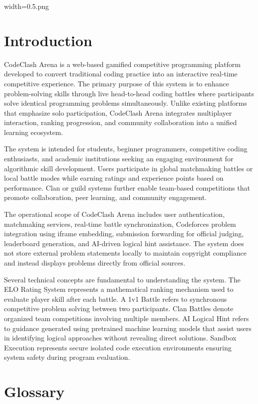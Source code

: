 width=0.5\linewidthimage.png\documentclass[12pt,a4paper]{article}
\begin{document}
\section{Introduction}

CodeClash Arena is a web-based gamified competitive programming platform developed to convert traditional coding practice into an interactive real-time competitive experience. The primary purpose of this system is to enhance problem-solving skills through live head-to-head coding battles where participants solve identical programming problems simultaneously. Unlike existing platforms that emphasize solo participation, CodeClash Arena integrates multiplayer interaction, ranking progression, and community collaboration into a unified learning ecosystem.

The system is intended for students, beginner programmers, competitive coding enthusiasts, and academic institutions seeking an engaging environment for algorithmic skill development. Users participate in global matchmaking battles or local battle modes while earning ratings and experience points based on performance. Clan or guild systems further enable team-based competitions that promote collaboration, peer learning, and community engagement.

The operational scope of CodeClash Arena includes user authentication, matchmaking services, real-time battle synchronization, Codeforces problem integration using iframe embedding, submission forwarding for official judging, leaderboard generation, and AI-driven logical hint assistance. The system does not store external problem statements locally to maintain copyright compliance and instead displays problems directly from official sources.

Several technical concepts are fundamental to understanding the system. The ELO Rating System represents a mathematical ranking mechanism used to evaluate player skill after each battle. A 1v1 Battle refers to synchronous competitive problem solving between two participants. Clan Battles denote organized team competitions involving multiple members. AI Logical Hint refers to guidance generated using pretrained machine learning models that assist users in identifying logical approaches without revealing direct solutions. Sandbox Execution represents secure isolated code execution environments ensuring system safety during program evaluation.

\section{Glossary}
\end{document}
